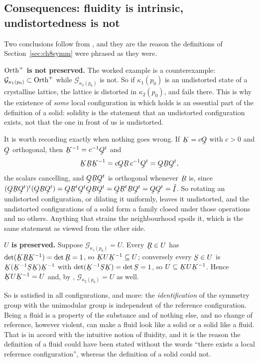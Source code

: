 \subsection*{Consequences: fluidity is intrinsic, undistortedness is
not}

Two conclusions follow from , and they are the reason the
definitions of Section~\ref{sec:ch8symm} were phrased as they were.

\medskip
\noindent\textbf{$\operatorname{Orth}^{+}$ is not preserved.} The worked example is a
counterexample: $\mathcal{G}_{\kappa_{1}(p_{0})}\subset\operatorname{Orth}^{+}$ while
$\mathcal{G}_{\kappa_{2}(p_{0})}$ is not. So if $\kappa_{1}(p_{0})$ is
an undistorted state of a crystalline lattice, the lattice is distorted
in $\kappa_{2}(p_{0})$, and  fails there. This is why the
existence of \emph{some} local configuration in which  holds
is an essential part of the definition of a solid: solidity is the
statement that an undistorted configuration exists, not that the one in
front of us is undistorted.

It is worth recording exactly when nothing goes wrong. If
$\bK=c\bQ$ with $c>0$ and $\bQ$ orthogonal, then $\bK^{-1}=c^{-1}\bQ^{t}$
and
\[
   \bK\bR\bK^{-1}=c\bQ\bR\,c^{-1}\bQ^{t}=\bQ\bR\bQ^{t},
\]
the scalars cancelling, and $\bQ\bR\bQ^{t}$ is orthogonal whenever $\bR$
is, since $(\bQ\bR\bQ^{t})^{t}(\bQ\bR\bQ^{t})=
\bQ\bR^{t}\bQ^{t}\bQ\bR\bQ^{t}=\bQ\bR^{t}\bR\bQ^{t}=\bQ\bQ^{t}=\hI$.
So rotating an undistorted configuration, or dilating it uniformly,
leaves it undistorted, and the undistorted configurations of a solid
form a family closed under those operations and no others. Anything that
strains the neighbourhood spoils it, which is the same statement as
 viewed from the other side.

\medskip
\noindent\textbf{$U$ is preserved.} Suppose
$\mathcal{G}_{\kappa_{1}(p_{0})}=U$. Every $\bR\in U$ has
$\det(\bK\bR\bK^{-1})=\det\bR=1$, so $\bK U\bK^{-1}\subseteq U$;
conversely every $\bS\in U$ is $\bK(\bK^{-1}\bS\bK)\bK^{-1}$ with
$\det(\bK^{-1}\bS\bK)=\det\bS=1$, so $U\subseteq\bK U\bK^{-1}$. Hence
$\bK U\bK^{-1}=U$ and, by ,
$\mathcal{G}_{\kappa_{2}(p_{0})}=U$ as well.

So  is satisfied in all configurations, and more: the
\emph{identification} of the symmetry group with the unimodular group is
independent of the reference configuration. Being a fluid is a property
of the substance and of nothing else, and no change of reference,
however violent, can make a fluid look like a solid or a solid like a
fluid. That is in accord with the intuitive notion of fluidity, and it
is the reason the definition of a fluid could have been stated without
the words ``there exists a local reference configuration'', whereas the
definition of a solid could not.

